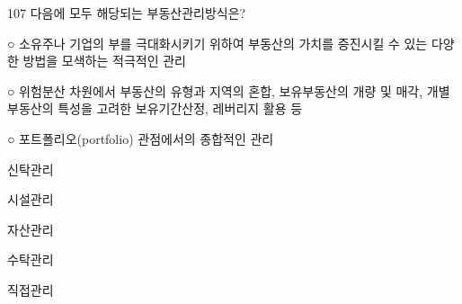 \begin{question}{107}
다음에 모두 해당되는 부동산관리방식은?
\begin{framedtext}
○ 소유주나 기업의 부를 극대화시키기 위하여 부동산의 가치를 증진시킬 수 있는 다양한 방법을 모색하는 적극적인 관리 \par
○ 위험분산 차원에서 부동산의 유형과 지역의 혼합, 보유부동산의 개량 및 매각, 개별 부동산의 특성을 고려한 보유기간산정, 레버리지 활용 등 \par
○ 포트폴리오(portfolio) 관점에서의 종합적인 관리
\end{framedtext}
\begin{choices}
  \item 신탁관리
  \item 시설관리
  \item 자산관리
  \item 수탁관리
  \item 직접관리
\end{choices}
\end{question}
